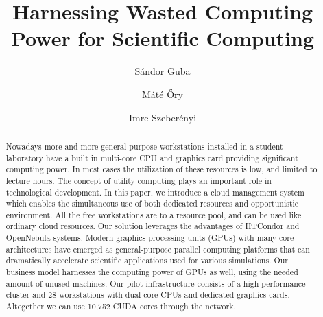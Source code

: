 \documentclass{llncs}
\begin{document}
%
\mainmatter              %
%
\title{Harnessing Wasted Computing Power for
Scientific Computing}
%
%
\author{S\'andor Guba \and M\'at\'e \H{O}ry \and Imre Szeber\'enyi}
%
%
%

\maketitle              %

\begin{abstract}

Nowadays more and more general purpose workstations installed in a student laboratory have a built in multi-core CPU and graphics card providing significant computing power. In most cases the utilization of these resources is low, and limited to lecture hours. The concept of utility computing plays an important role in technological development. 
In  this paper, we introduce a cloud management system which enables the simultaneous use of both dedicated resources and opportunistic environment. All the free workstations are to a resource pool, and can be used like ordinary cloud resources. Our solution leverages the advantages of HTCondor and OpenNebula systems.
Modern graphics processing units (GPUs) with many-core architectures have emerged as general-purpose parallel computing platforms that can dramatically accelerate scientific applications used for various simulations. Our business model harnesses the computing power of GPUs as well, using the needed amount of unused machines.
Our pilot infrastructure consists of a high performance cluster and 28 workstations with dual-core CPUs and dedicated graphics cards. Altogether we can use 10,752 CUDA cores through the network.


\end{abstract}
%
\end{document}

